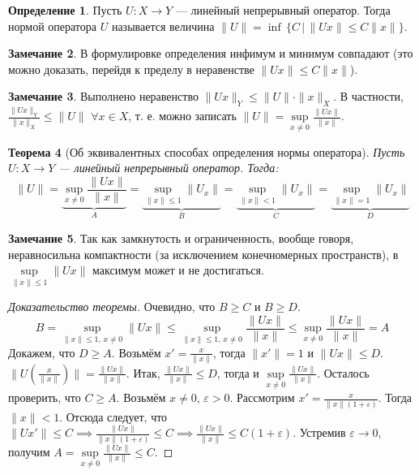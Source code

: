 \documentclass[11pt,openany,a4paper]{scrartcl}
\theoremstyle{plain}
\newtheorem{theorem}{Теорема}[section]
\theoremstyle{definition}
\newtheorem{definition}[theorem]{Определение}
\newtheorem{remark}[theorem]{Замечание}
\begin{document}
\begin{definition}
    Пусть $U: X \to Y$ — линейный непрерывный оператор. Тогда нормой оператора $U$
    называется величина $\|U\| = \inf\,\{C\,\big|\,\|Ux\| \leqslant C \|x\|\}$.
\end{definition}
\begin{remark}
    В формулировке определения инфимум и минимум совпадают (это можно доказать, перейдя к 
    пределу в неравенстве $\|Ux\| \leqslant C \|x\|$).
\end{remark}
\begin{remark}
    Выполнено неравенство $\|Ux\|_Y \leqslant \|U\|\cdot \|x\|_X$. В частности,
    $\frac{\|Ux\|_Y}{\|x\|_X} \leqslant \|U\|$ $\forall x \in X$, т. е. можно записать
    $\|U\| = \sup\limits_{x \neq 0}\frac{\|Ux\|}{\|x\|}$. 
\end{remark}
\begin{theorem}[Об эквивалентных способах определения нормы оператора]
     Пусть $U: X \to Y$ — линейный непрерывный оператор. Тогда:
     $$
     \|U\| = \underbrace{\sup\limits_{x \neq 0}\frac{\|Ux\|}{\|x\|}}_A =
     \underbrace{\sup\limits_{\|x\|\leqslant 1} \|U_x\|}_B =
     \underbrace{\sup\limits_{\|x\| < 1} \|U_x\|}_C =
     \underbrace{\sup\limits_{\|x\| = 1} \|U_x\|}_D
     $$
\end{theorem}
\begin{remark}
    Так как замкнутость и ограниченность, вообще говоря, неравносильна компактности
    (за исключением конечномерных пространств),
    в $\sup\limits_{\|x\|\leqslant 1} \|Ux\|$ максимум может и не достигаться.
\end{remark}
\begin{proof}[Доказательство теоремы]
    Очевидно, что $B \geqslant C$ и $B \geqslant D$.
    $$
    B =\sup\limits_{\|x\|\leqslant 1,\,x \neq 0} \|Ux\| \leqslant
    \sup\limits_{\|x\|\leqslant 1,\,x \neq 0} \frac{\|Ux\|}{\|x\|} \leqslant
    \sup\limits_{x \neq 0} \frac{\|Ux\|}{\|x\|} = A
    $$
    Докажем, что $D \geqslant A$. Возьмём $x'=\frac{x}{\|x\|}$, тогда $\|x'\|=1$ и
    $\|Ux\|\leqslant D$. $\|U(\frac{x}{\|x\|})\| = \frac{\|Ux\|}{\|x\|}$.
    Итак, $\frac{\|Ux\|}{\|x\|} \leqslant D$, тогда и
    $\sup\limits_{x \neq 0}\frac{\|Ux\|}{\|x\|}$.
    Осталось проверить, что $C \geqslant A$. Возьмём $x \neq 0$, $\varepsilon > 0$.
    Рассмотрим $x' = \frac{x}{\|x\|(1 + \varepsilon)}$. Тогда $\|x\| < 1$. Отсюда
    следует, что $\|Ux'\| \leqslant C \implies \frac{\|Ux\|}{\|x\|(1+\varepsilon)}
    \leqslant C \implies \frac{\|Ux\|}{\|x\|}\leqslant C(1 + \varepsilon)$. Устремив
    $\varepsilon \to 0$, получим
    $A = \sup\limits_{x \neq 0} \frac{\|Ux\|}{\|x\|} \leqslant C$.
\end{proof}
\end{document}
